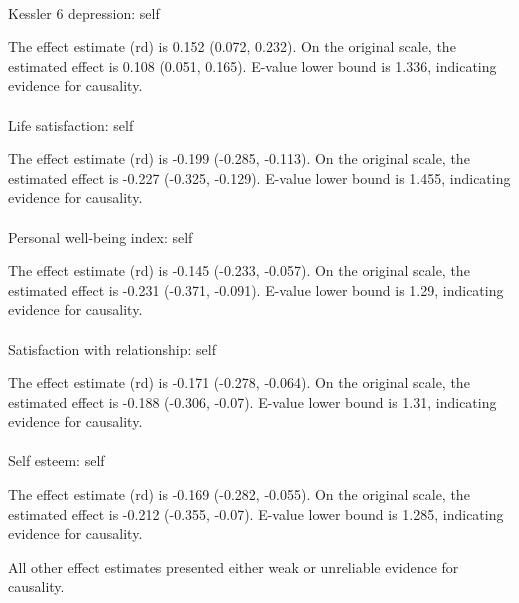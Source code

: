 \documentclass[
  single column]{article}
\makeatletter
\let\oldparagraph\paragraph
\renewcommand{\paragraph}{
    \@ifstar
      \xxxParagraphStar
      \xxxParagraphNoStar
  }
\newcommand{\xxxParagraphStar}[1]{\oldparagraph*{#1}\mbox{}}
\newcommand{\xxxParagraphNoStar}[1]{\oldparagraph{#1}\mbox{}}
\makeatother
\begin{document}
\paragraph{Kessler 6 depression:
self}\label{kessler-6-depression-self-2}

The effect estimate (rd) is 0.152 (0.072, 0.232). On the original scale,
the estimated effect is 0.108 (0.051, 0.165). E-value lower bound is
1.336, indicating evidence for causality.

\paragraph{Life satisfaction: self}\label{life-satisfaction-self-7}

The effect estimate (rd) is -0.199 (-0.285, -0.113). On the original
scale, the estimated effect is -0.227 (-0.325, -0.129). E-value lower
bound is 1.455, indicating evidence for causality.

\paragraph{Personal well-being index:
self}\label{personal-well-being-index-self-3}

The effect estimate (rd) is -0.145 (-0.233, -0.057). On the original
scale, the estimated effect is -0.231 (-0.371, -0.091). E-value lower
bound is 1.29, indicating evidence for causality.

\paragraph{Satisfaction with relationship:
self}\label{satisfaction-with-relationship-self}

The effect estimate (rd) is -0.171 (-0.278, -0.064). On the original
scale, the estimated effect is -0.188 (-0.306, -0.07). E-value lower
bound is 1.31, indicating evidence for causality.

\paragraph{Self esteem: self}\label{self-esteem-self-4}

The effect estimate (rd) is -0.169 (-0.282, -0.055). On the original
scale, the estimated effect is -0.212 (-0.355, -0.07). E-value lower
bound is 1.285, indicating evidence for causality.

All other effect estimates presented either weak or unreliable evidence
for causality.
\end{document}
